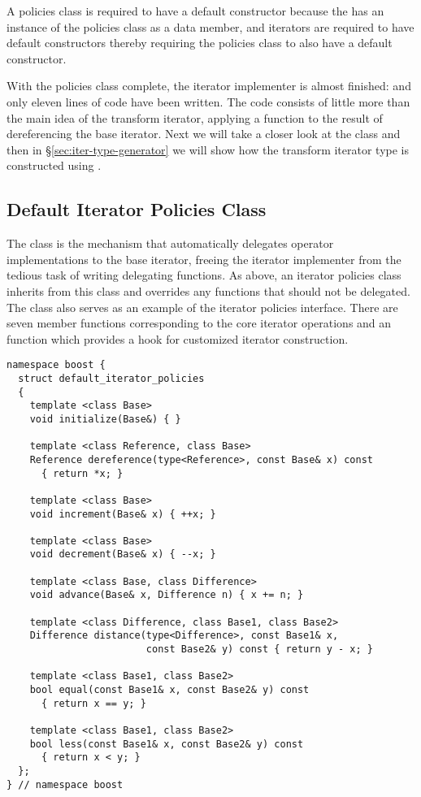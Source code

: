 \documentclass{netobjectdays}
\begin{document}
A policies class is required to have a default constructor because the
 has an instance of the policies class as a
data member, and iterators are required to have default constructors
thereby requiring the policies class to also have a default
constructor.

With the policies class complete, the iterator implementer is almost
finished: and only eleven lines of code have been written. The code
consists of little more than the main idea of the transform iterator,
applying a function to the result of dereferencing the base iterator.
Next we will take a closer look at the
 class and then in
\S\ref{sec:iter-type-generator} we will show how the transform
iterator type is constructed using .


\subsection{Default Iterator Policies Class}

The  class is the mechanism that
automatically delegates operator implementations to the base iterator,
freeing the iterator implementer from the tedious task of writing
delegating functions. As above, an iterator policies class inherits
from this class and overrides any functions that should not be
delegated. The  class also
serves as an example of the iterator policies interface. There are
seven member functions corresponding to the core iterator operations
and an  function which provides a hook for
customized iterator construction.

{\footnotesize
\begin{verbatim}
namespace boost {
  struct default_iterator_policies
  {
    template <class Base>
    void initialize(Base&) { }

    template <class Reference, class Base>
    Reference dereference(type<Reference>, const Base& x) const
      { return *x; }

    template <class Base>
    void increment(Base& x) { ++x; }

    template <class Base>
    void decrement(Base& x) { --x; }

    template <class Base, class Difference>
    void advance(Base& x, Difference n) { x += n; }

    template <class Difference, class Base1, class Base2>
    Difference distance(type<Difference>, const Base1& x,
                        const Base2& y) const { return y - x; }

    template <class Base1, class Base2>
    bool equal(const Base1& x, const Base2& y) const
      { return x == y; }

    template <class Base1, class Base2>
    bool less(const Base1& x, const Base2& y) const
      { return x < y; }
  };
} // namespace boost
\end{verbatim}
}
\end{document}
